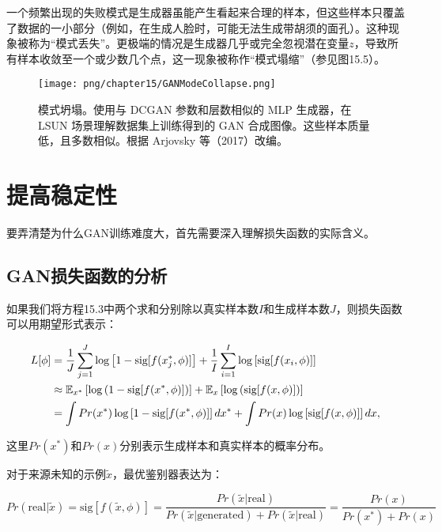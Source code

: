 一个频繁出现的失败模式是生成器虽能产生看起来合理的样本，但这些样本只覆盖了数据的一小部分（例如，在生成人脸时，可能无法生成带胡须的面孔）。这种现象被称为“模式丢失”。更极端的情况是生成器几乎或完全忽视潜在变量\(z\)，导致所有样本收敛至一个或少数几个点，这一现象被称作“模式塌缩”（参见图15.5）。

\begin{figure}[ht!]
\centering
\texttt{[image: png/chapter15/GANModeCollapse.png]}
\caption{模式坍塌。使用与 DCGAN 参数和层数相似的 MLP 生成器，在 LSUN 场景理解数据集上训练得到的 GAN 合成图像。这些样本质量低，且多数相似。根据 Arjovsky 等（2017）改编。}
\end{figure}


\section{提高稳定性}
要弄清楚为什么GAN训练难度大，首先需要深入理解损失函数的实际含义。

\subsection{GAN损失函数的分析}
如果我们将方程15.3中两个求和分别除以真实样本数\(I\)和生成样本数\(J\)，则损失函数可以用期望形式表示：


\begin{align}
L[\phi] &= \frac{1}{J} \sum_{j=1}^{J} \log \left[ 1 - \text{sig}[f(x_j^*, \phi)] \right] + \frac{1}{I} \sum_{i=1}^{I} \log \left[ \text{sig}[f(x_i, \phi)] \right] \notag \\
&\approx \mathbb{E}_{x^*} \left[ \log \left( 1 - \text{sig}[f(x^*, \phi)] \right) \right] + \mathbb{E}_{x} \left[ \log \left( \text{sig}[f(x, \phi)] \right) \right] \notag \\
&= \int Pr(x^*) \log \left[ 1 - \text{sig}[f(x^*, \phi)] \right] dx^* + \int Pr(x) \log \left[ \text{sig}[f(x, \phi)] \right] dx, 
\end{align} 


这里\(Pr(x^*)\)和\(Pr(x)\)分别表示生成样本和真实样本的概率分布。

对于来源未知的示例\(\tilde{x}\)，最优鉴别器表达为：

\begin{equation}
Pr(\text{real}|\tilde{x}) = \text{sig}[f(\tilde{x}, \phi)] = \frac{Pr(\tilde{x}|\text{real})}{Pr(\tilde{x}|\text{generated}) + Pr(\tilde{x}|\text{real})} = \frac{Pr(x)}{Pr(x^*) + Pr(x)} 
\end{equation}

